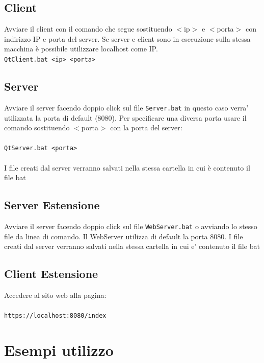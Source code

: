 \documentclass{article}
\begin{document}
            \subsection{Client}
            Avviare il client con il comando
            che segue sostituendo $<$ip$>$ e $<$porta$>$ con indirizzo IP e porta
            del server. Se server e client sono in esecuzione sulla stessa 
            macchina è possibile utilizzare localhost come IP. \\
    
            \verb|QtClient.bat <ip> <porta>|

            \subsection{Server}
            Avviare il server facendo doppio click sul file 
            \verb|Server.bat| in questo caso verra' utilizzata la porta di
            default (8080). Per specificare una diversa porta 
            usare il comando sostituendo $<$porta$>$ con la porta del server: \\\\
            \verb|QtServer.bat <porta>|\\\\
            I file creati dal server verranno salvati nella stessa cartella
            in cui è contenuto il file bat
            
            \subsection{Server Estensione}
            Avviare il server facendo doppio click sul file 
            \verb|WebServer.bat| o avviando lo stesso file da linea di comando.
            Il WebServer utilizza di default la porta 8080.
            I file creati dal server verranno salvati nella stessa cartella
            in cui e' contenuto il file bat
            
            \subsection{Client Estensione}
            Accedere al sito web alla pagina: \\\\
            \verb|https://localhost:8080/index|


    \section{Esempi utilizzo}
\end{document}
